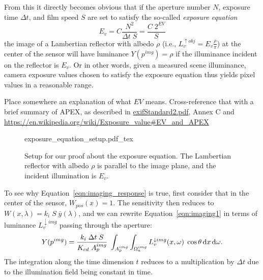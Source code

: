 
From this it directly becomes obvious that if the aperture number $N$,
\gls{exposure time} $\Delta t$, and \gls{film speed} $S$ are set to satisfy the
so-called \emph{exposure equation}
\begin{equation}\label{eqn:imaging_Ev}
E_v = C \frac{N^2}{\Delta t\; S} = \frac{C\; 2^{EV}}S
\end{equation}
the image of a Lambertian reflector with albedo $\rho$ (i.e.,
$L_v^{\uparrow obj} = E_v \frac \rho \pi$) at the center of the sensor
will have luminance $Y(p^{img}) = \rho$ if the illuminance incident on
the reflector is $E_v$. Or in other words, given a measured scene
illuminance, camera exposure values chosen to satisfy the exposure
equation thus yields pixel values in a reasonable range.

\begin{inconstruction}
	Place somewhere an explanation of what $EV$ means.
	Cross-reference that with a brief summary of APEX, as described in
	\url{exifStandard2.pdf}, Annex C and \url{https://en.wikipedia.org/wiki/Exposure_value#EV_and_APEX}
\end{inconstruction}

\begin{figure}[t]
    \centering
    \def\svgwidth{0.9\linewidth}
    {exposure_equation_setup.pdf_tex}
    \caption{\label{fig:exposure_equation_setup}%
        Setup for our proof about the exposure equation. The Lambertian reflector with albedo $\rho$ is parallel to 
        the image plane, and the incident illumination is $E_v$. }
\end{figure}

To see why Equation~\eqref{eqn:imaging_response} is true, first consider that in the center of the sensor,
$W_{pos}(x) = 1$. The sensitivity then reduces to $W(x,\lambda) = k_i\;S\;\bar y(\lambda)$,
and we can rewrite Equation~\eqref{eqn:imaging1} in terms of luminance
$L_v^{\downarrow img}$ passing through the aperture:
\begin{equation}\label{eqn:imaging_y}
Y(p^{img}) 
           = \frac{k_i\; \Delta t \; S}{K_{cd}\;A^{img}_p} \;
             \int_{A_p^{img}} 
             \int_{\Omega_a^{img}} 
                L^{\downarrow img}_{v}(x, \omega) \;
                \cos\theta \mathop{}\!\mathrm{d} x \mathop{}\!\mathrm{d}\omega.
\end{equation}
The integration along the time dimension $t$ reduces to a multiplication
by $\Delta t$ due to the illumination field being constant in time. 


